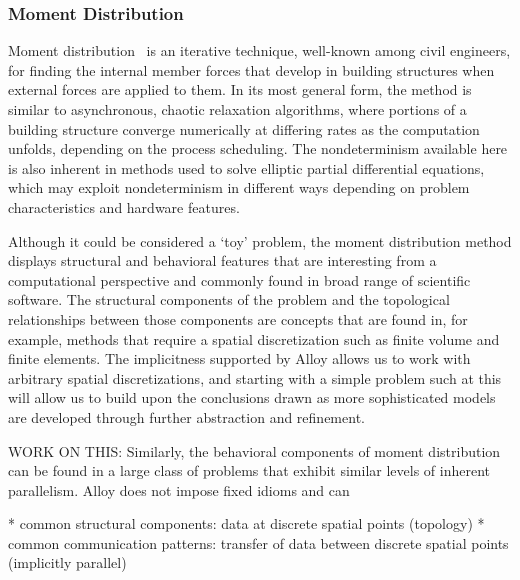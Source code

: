 \documentclass[../../proposal.tex]{subfiles}
\begin{document}
\subsubsection{Moment Distribution}

Moment distribution~\cite{} is an iterative technique, well-known among civil engineers, for finding the internal member forces that develop in building structures when external forces are applied to them.  In its most general form, the method is similar to asynchronous, chaotic relaxation algorithms, where portions of a building structure converge numerically at differing rates as the computation unfolds, depending on the process scheduling.  The nondeterminism available here is also inherent in methods used to solve elliptic partial differential equations, which may exploit nondeterminism in different ways depending on problem characteristics and hardware features. 

Although it could be considered a `toy' problem, the moment distribution method displays structural and behavioral features that are interesting from a computational perspective and commonly found in broad range of scientific software.  The structural components of the problem and the topological relationships between those components are concepts that are found in, for example, methods that require a spatial discretization such as finite volume and finite elements.  The implicitness supported by Alloy allows us to work with arbitrary spatial discretizations, and starting with a simple problem such at this will allow us to build upon the conclusions drawn as more sophisticated models are developed through further abstraction and refinement.

WORK ON THIS:
Similarly, the behavioral components of moment distribution can be found in a large class of problems that exhibit similar levels of inherent parallelism.  Alloy does not impose fixed idioms and can 

* common structural components: data at discrete spatial points (topology)
* common communication patterns: transfer of data between discrete spatial points (implicitly parallel)

\end{document}
